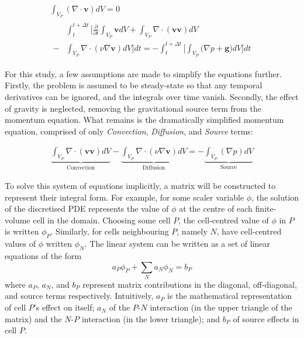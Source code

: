 \documentclass[final,3p,times,twocolumn]{elsarticle}
\begin{document}
\begin{gather}
    \int_{V_P} (\nabla \cdot \mathbf{v}) dV = 0
    \label{eqn:continuity}
    \\
    \begin{split}
        &\int_{t}^{t+\Delta t} \biggl[ \frac{\partial}{\partial t} \int_{V_P} \mathbf{v} dV + \int_{V_P} \nabla \cdot (\mathbf{v} \mathbf{v}) dV 
        \\
        - &\int_{V_P} \nabla \cdot (\nu \nabla \mathbf{v}) dV \biggr] dt = 
        - \int_{t}^{t+\Delta t} \biggl[\int_{V_P} \biggl( \nabla p + \mathbf{g} \biggr) dV \biggr] dt
    \end{split}
    \label{eqn:momentum}
\end{gather}

For this study, a few assumptions are made to simplify the equations further. Firstly, the problem is assumed to be steady-state so that any temporal derivatives can be ignored, and the integrals over time vanish. Secondly, the effect of gravity is neglected, removing the gravitational source term from the momentum equation. What remains is the dramatically simplified momentum equation, comprised of only \textit{Convection}, \textit{Diffusion}, and \textit{Source} terms:

\begin{gather}
    \underbrace{\int_{V_P} \nabla \cdot (\mathbf{v} \mathbf{v}) dV}_\textrm{Convection} - \underbrace{\int_{V_P} \nabla \cdot (\nu \nabla \mathbf{v}) dV}_\textrm{Diffusion} = - \underbrace{\int_{V_P} (\nabla p) dV}_\textrm{Source}
    \label{eqn:momentum_simp}
\end{gather}

To solve this system of equations implicitly, a matrix will be constructed to represent their integral form. For example, for some scaler variable $\phi$, the solution of the discretised PDE represents the value of $\phi$ at the centre of each finite-volume cell in the domain. Choosing some cell $P$, the cell-centred value of $\phi$ in $P$ is written $\phi _P$. Similarly, for cells neighbouring $P$, namely $N$, have cell-centred values of $\phi$ written $\phi _N$. The linear system can be written as a set of linear equations of the form $$a_P \phi_P + \sum \limits _N a_N \phi _N = b_P$$ where $a_P$, $a_N$, and $b_P$ represent matrix contributions in the diagonal, off-diagonal, and source terms respectively. Intuitively, $a_P$ is the mathematical representation of cell $P$'s effect on itself; $a_N$ of the $P$-$N$ interaction (in the upper triangle of the matrix) and the $N$-$P$ interaction (in the lower triangle); and $b_P$ of source effects in cell $P$. 
\end{document}
